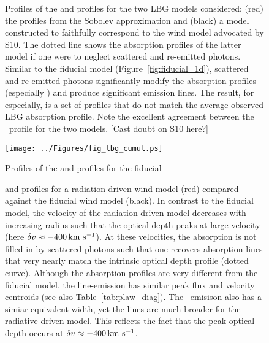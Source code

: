 \documentclass[12pt,preprint]{aastex}
\begin{document}
\clearpage

\begin{figure}
\caption{
Profiles of the  and  profiles for the two
LBG models considered: (red) the profiles from the 
Sobolev approximation 
and (black) a model constructed to faithfully
correspond to the wind model advocated by S10.  The dotted line
shows the absorption profiles of the latter model if one were
to neglect scattered and re-emitted photons.  Similar to the fiducial
model (Figure~\ref{fig:fiducial_1d}), scattered and re-emitted photons
significantly modify the absorption profiles (especially )
and produce significant emission lines.  
The result, for  especially, is a set of profiles that do
not match the average observed LBG absorption profile.
Note the excellent agreement
between the \mgiia\ profile for the two models. [Cast doubt on S10
here?]
}
\label{fig:LBG_spec}
\end{figure}

\begin{figure}
\texttt{[image: ../Figures/fig\_lbg\_cumul.ps]}
\caption{
Profiles of the  and  profiles for the fiducial
}
\label{fig:LBG_cumul}
\end{figure}



\begin{figure}
\caption{
 and 
profiles for a radiation-driven wind model (red) compared against the
fiducial wind model (black).  In contrast to the fiducial model, the
velocity of the radiation-driven model decreases with increasing
radius such that the optical depth peaks at large velocity (here $\delta v
\approx -400 \, {\rm km~s^{-1}}$).  At these velocities, the absorption is not
filled-in by scattered photons such that one recovers absorption lines
that very nearly match the intrinsic optical depth profile (dotted
curve).  Although the  absorption profiles are very
different from the fiducial model, the  line-emission has
similar peak flux and velocity centroids (see also
Table~\ref{tab:plaw_diag}).  The \feiis\ emisison also has a simiar
equivalent width, yet the lines are much broader for the
radiative-driven model. This reflects the fact that the peak optical
depth occurs at $\delta v \approx -400 \, {\rm km~s^{-1}}$.
}
\label{fig:rad_spec}
\end{figure}
\end{document}

